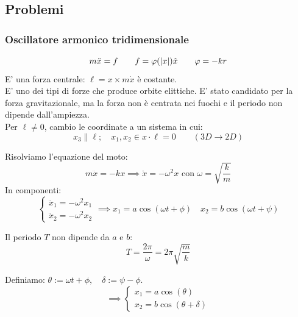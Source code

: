 

\subsection{Problemi}


\subsubsection{Oscillatore armonico tridimensionale}
\begin{equation}
    m\ddot{x}= f \qquad f = \varphi(\abs{x})\hat{x}\qquad \varphi = -kr
\end{equation}
E' una forza centrale: $\ell= x\times m\dot{x}$ è costante.\\
E' uno dei tipi di forze che produce orbite elittiche. 
E' stato candidato per la forza gravitazionale, ma la forza non è centrata nei fuochi
e il periodo non dipende dall'ampiezza.\\

Per $\ell  \neq 0$, cambio le coordinate a un sistema in cui:
\begin{equation}
    x_3 \parallel \ell; \quad x_1,x_2 \in x\cdot\ell=0  \qquad (3D\rightarrow 2D)
\end{equation}

Risolviamo l'equazione del moto:
\begin{equation*}
    m\ddot{x}= -kx \implies \ddot{x}= -\omega^2 x \text{ con } \omega= \sqrt{\frac{k}{m}}
\end{equation*}
In componenti:
\begin{equation}
    \begin{cases}
        \ddot{x}_1= -\omega^2 x_1\\
        \ddot{x}_2= -\omega^2 x_2
    \end{cases}\implies
    x_1 = a \cos(\omega t +\phi)\quad x_2= b\cos(\omega t + \psi)
\end{equation}
\begin{remark}
    Il periodo $T$ non dipende da $a$ e $b$:
    \begin{equation}
        T = \frac{2\pi}{\omega}= 2\pi\sqrt{\frac{m}{k}}
    \end{equation} 
\end{remark}

Definiamo: $\theta:=\omega t + \phi, \quad\delta:=\psi-\phi$.
\begin{equation}
    \implies \begin{cases}
        x_1 = a\cos(\theta)\\
        x_2 = b\cos(\theta+\delta)
    \end{cases}
\end{equation}

